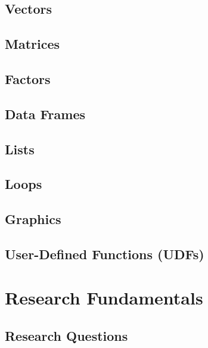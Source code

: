 \documentclass[]{book}
\begin{document}
\hypertarget{vectors}{%
\section{Vectors}\label{vectors}}

\hypertarget{matrices}{%
\section{Matrices}\label{matrices}}

\hypertarget{factors}{%
\section{Factors}\label{factors}}

\hypertarget{data-frames}{%
\section{Data Frames}\label{data-frames}}

\hypertarget{lists}{%
\section{Lists}\label{lists}}

\hypertarget{loops}{%
\section{Loops}\label{loops}}

\hypertarget{graphics}{%
\section{Graphics}\label{graphics}}

\hypertarget{user-defined-functions-udfs}{%
\section{User-Defined Functions (UDFs)}\label{user-defined-functions-udfs}}

\hypertarget{research}{%
\chapter{Research Fundamentals}\label{research}}

\hypertarget{research-questions}{%
\section{Research Questions}\label{research-questions}}
\end{document}
